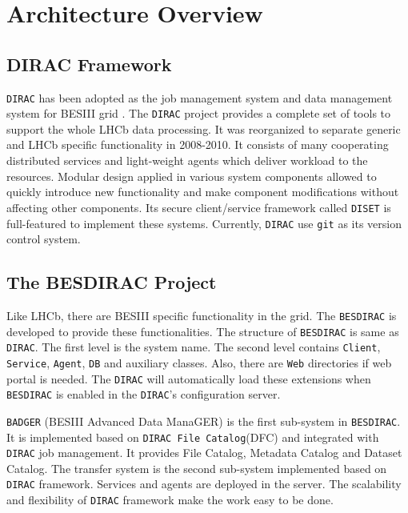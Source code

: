 \section{Architecture Overview}

\subsection{DIRAC Framework}

{\tt DIRAC} \cite{bib:dirac3,bib:diracgit} 
has been adopted as the job management system and data management
system for BESIII grid \cite{bib:besdfc}. 
The {\tt DIRAC} project provides a 
complete set of tools to support the whole LHCb data processing.
It was reorganized to separate generic and LHCb specific functionality
in 2008-2010.
%
It consists of many cooperating distributed services and light-weight
agents which deliver workload to the resources.
Modular design applied in various system components allowed to quickly
introduce new functionality and make component modifications without
affecting other components.
Its secure client/service framework called {\tt DISET} \cite{bib:diset} 
is full-featured to implement these systems.
Currently, {\tt DIRAC} use {\tt git} as its version control system.

\subsection{The BESDIRAC Project}

Like LHCb, there are BESIII specific functionality in the grid.
The {\tt BESDIRAC} \cite{bib:besdirac} 
is developed to provide these functionalities.
The structure of {\tt BESDIRAC} is same as {\tt DIRAC}.
The first level is the system name. The second level contains
{\tt Client}, {\tt Service}, {\tt Agent}, {\tt DB} and auxiliary classes.
Also, there are {\tt Web} directories if web portal is needed.
The {\tt DIRAC} will automatically load these extensions when 
{\tt BESDIRAC} is enabled in the {\tt DIRAC}'s configuration server.

{\tt BADGER} (BESIII Advanced Data ManaGER) is the first sub-system
in {\tt BESDIRAC}. It is implemented based on {\tt DIRAC File Catalog}(DFC)
and integrated with {\tt DIRAC} job management.
It provides File Catalog, Metadata Catalog and Dataset Catalog.
%
The transfer system is the second sub-system implemented based on
{\tt DIRAC} framework. Services and agents are deployed in the server.
The scalability and flexibility of {\tt DIRAC} framework make the work
easy to be done. 

